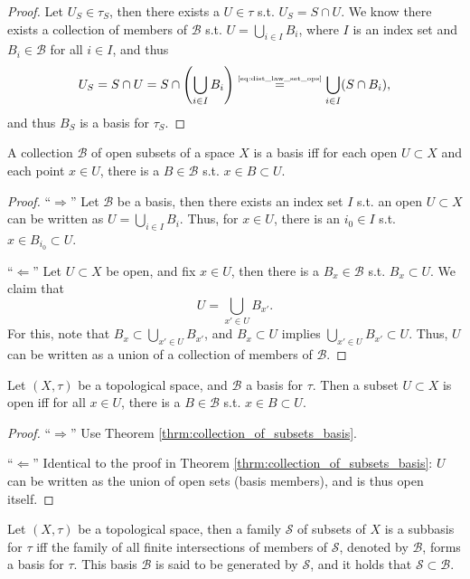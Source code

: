 \begin{proof}
	Let $U_S \in \tau_S$, then there exists a $U\in \tau$ s.t. $U_S = S\cap U$. We know there exists a collection of members of $\mathscr B$ s.t. $U = \bigcup_{i\in I}B_i$, where $I$ is an index set and $B_i\in\mathscr B$ for all $i\in I$, and thus 
	$$U_S = S\cap U = S\cap \left(\bigcup_{i\in I}B_i\right) \overset{\tiny\eqref{eq:dist_law_set_ops}}{=} \bigcup_{i\in I}(S\cap B_i),$$
	and thus $B_S$ is a basis for $\tau_S$.
\end{proof}

\begin{theorem}\label{thrm:collection_of_subsets_basis}
	A collection $\mathscr B$ of open subsets of a space $X$ is a basis iff for each open $U\subset X$ and each point $x\in U$, there is a $B\in\mathscr B$ s.t. $x\in B\subset U$.
\end{theorem}

\begin{proof}
	\enquote{$\Longrightarrow$} Let $\mathscr B$ be a basis, then there exists an index set $I$ s.t. an open $U\subset X$ can be written as $U = \bigcup_{i\in I}B_i$. Thus, for $x\in U$, there is an $i_0\in I$ s.t. $x\in B_{i_0}\subset U$.
	
	\enquote{$\Longleftarrow$} Let $U\subset X$ be open, and fix $x\in U$, then there is a $B_x\in \mathscr B$ s.t. $B_x\subset U$. We claim that $$U = \bigcup_{x'\in U}B_{x'}.$$ For this, note that $B_x\subset \bigcup_{x'\in U}B_{x'}$, and $B_x\subset U$ implies $\bigcup_{x'\in U}B_{x'}\subset U$. Thus, $U$ can be written as a union of a collection of members of $\mathscr B$.
\end{proof}

\begin{corollary}\label{corollary:open_set_basis_member_containment}
	Let $(X, \tau)$ be a topological space, and $\mathscr B$ a basis for $\tau$. Then a subset $U\subset X$ is open iff for all $x\in U$, there is a $B\in\mathscr B$ s.t. $x\in B\subset U$.
\end{corollary}

\begin{proof}
	\enquote{$\Longrightarrow$} Use Theorem \ref{thrm:collection_of_subsets_basis}.
	
	\enquote{$\Longleftarrow$} Identical to the proof in Theorem \ref{thrm:collection_of_subsets_basis}: $U$ can be written as the union of open sets (basis members), and is thus open itself.
\end{proof}

\begin{remark}\label{remark:basis_gen_by_subbasis}
	Let $(X, \tau)$ be a topological space, then a family $\mathscr S$ of subsets of $X$ is a subbasis for $\tau$ iff the family of all finite intersections of members of $\mathscr S$, denoted by $\mathscr B$, forms a basis for $\tau$. This basis $\mathscr B$ is said to be generated by $\mathscr S$, and it holds that $\mathscr S \subset \mathscr B$.
\end{remark}

